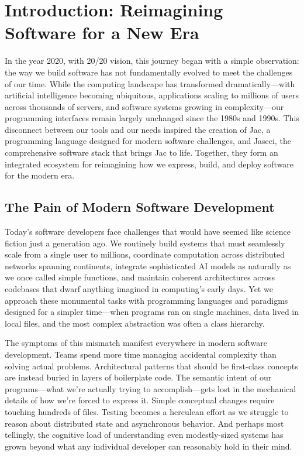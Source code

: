 \mtcaddchapter
\chapter{Introduction: Reimagining Software for a New Era}
\minitoc

In the year 2020, with 20/20 vision, this journey began with a simple observation: the way we build software has not fundamentally evolved to meet the challenges of our time. While the computing landscape has transformed dramatically—with artificial intelligence becoming ubiquitous, applications scaling to millions of users across thousands of servers, and software systems growing in complexity—our programming interfaces remain largely unchanged since the 1980s and 1990s. This disconnect between our tools and our needs inspired the creation of Jac, a programming language designed for modern software challenges, and Jaseci, the comprehensive software stack that brings Jac to life. Together, they form an integrated ecosystem for reimagining how we express, build, and deploy software for the modern era.

\section{The Pain of Modern Software Development}

Today's software developers face challenges that would have seemed like science fiction just a generation ago. We routinely build systems that must seamlessly scale from a single user to millions, coordinate computation across distributed networks spanning continents, integrate sophisticated AI models as naturally as we once called simple functions, and maintain coherent architectures across codebases that dwarf anything imagined in computing's early days. Yet we approach these monumental tasks with programming languages and paradigms designed for a simpler time—when programs ran on single machines, data lived in local files, and the most complex abstraction was often a class hierarchy.

The symptoms of this mismatch manifest everywhere in modern software development. Teams spend more time managing accidental complexity than solving actual problems. Architectural patterns that should be first-class concepts are instead buried in layers of boilerplate code. The semantic intent of our programs—what we're actually trying to accomplish—gets lost in the mechanical details of how we're forced to express it. Simple conceptual changes require touching hundreds of files. Testing becomes a herculean effort as we struggle to reason about distributed state and asynchronous behavior. And perhaps most tellingly, the cognitive load of understanding even modestly-sized systems has grown beyond what any individual developer can reasonably hold in their mind.

